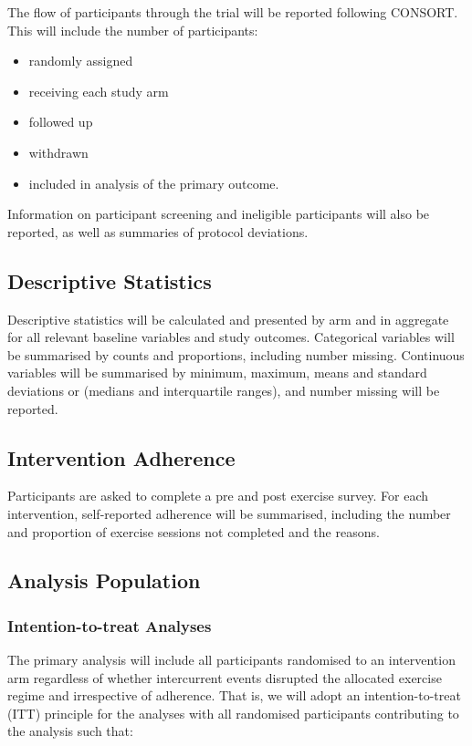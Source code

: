 \documentclass[11pt,parskip=half-]{scrartcl}
\providecommand{\tightlist}{%
  \setlength{\itemsep}{0pt}\setlength{\parskip}{0pt}}
\begin{document}
The flow of participants through the trial will be reported following CONSORT. This will include the number of participants:

\begin{itemize}
  \tightlist
  \item randomly assigned
  \item receiving each study arm
  \item followed up
  \item withdrawn
  \item included in analysis of the primary outcome.
\end{itemize}

Information on participant screening and ineligible participants will also be reported, as well as summaries of protocol deviations.


\subsection{Descriptive Statistics}\label{descriptive-statistics}

Descriptive statistics will be calculated and presented by arm and in aggregate for all relevant baseline variables and study outcomes. Categorical variables will be summarised by counts and proportions, including number missing. Continuous variables will be summarised by minimum, maximum, means and standard deviations or (medians and interquartile ranges), and number missing will be reported.

\subsection{Intervention Adherence}\label{adherence}

Participants are asked to complete a pre and post exercise survey. For each intervention, self-reported adherence will be summarised, including the number and proportion of exercise sessions not completed and the reasons.

\subsection{Analysis Population}\label{analysis-population}

\subsubsection{Intention-to-treat Analyses}

The primary analysis will include all participants randomised to an intervention arm regardless of whether intercurrent events disrupted the allocated exercise regime and irrespective of adherence. That is, we will adopt an intention-to-treat (ITT) principle for the analyses with all randomised participants contributing to the analysis such that:
\end{document}
